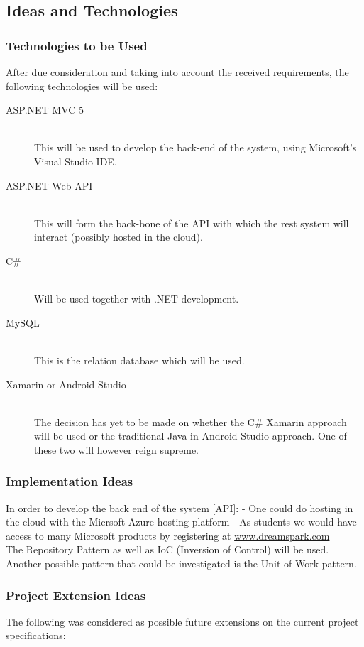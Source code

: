 \subsection{Ideas and Technologies}
\subsubsection{Technologies to be Used}
After due consideration and taking into account the received requirements, the following technologies will be used:
\begin{description}
	\item[ASP.NET MVC 5]\hfill\\
	This will be used to develop the back-end of the system, using Microsoft's Visual Studio IDE.
	\item[ASP.NET Web API]\hfill\\
	This will form the back-bone of the API with which the rest system will interact (possibly hosted in the cloud).
	\item[C\#]\hfill\\
	Will be used together with .NET development.
	\item[MySQL]\hfill\\	
	This is the relation database which will be used.
	\item[Xamarin or Android Studio]\hfill\\
	The decision has yet to be made on whether the C\# Xamarin approach will be used or the traditional Java in Android Studio approach. One of these two will however reign supreme.
	
\end{description}
	
\subsubsection{Implementation Ideas}	
In order to develop the back end of the system [API]:
- One could do hosting in the cloud with the Micrsoft Azure hosting platform
- As students we would have access to many Microsoft products by registering at \href{http://www.dreamspark.com}{www.dreamspark.com}\\
The Repository Pattern as well as IoC (Inversion of Control) will be used. Another possible pattern that could be investigated is the Unit of Work pattern.
	
\subsubsection{Project Extension Ideas}
The following was considered as possible future extensions on the current project specifications:

